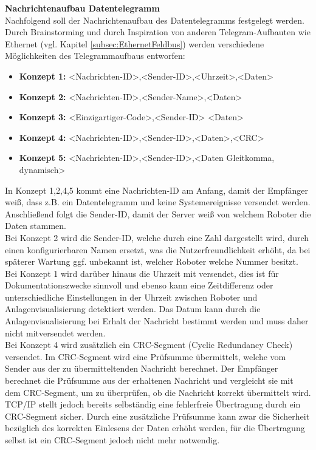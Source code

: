 \documentclass[ a4paper,
                oneside,
                toc=bibliography,
                toc=listof
                ]{scrbook}
\begin{document}
	\textbf{Nachrichtenaufbau Datentelegramm}\\
	Nachfolgend soll der Nachrichtenaufbau des Datentelegramms festgelegt werden. Durch Brainstorming und durch Inspiration von anderen Telegram-Aufbauten wie Ethernet (vgl. Kapitel \ref{subsec:EthernetFeldbus}) werden verschiedene Möglichkeiten des Telegrammaufbaus entworfen:\\
	\begin{itemize}
		\item \textbf{Konzept 1:} <Nachrichten-ID>,<Sender-ID>,<Uhrzeit>,<Daten>
		\item \textbf{Konzept 2:} <Nachrichten-ID>,<Sender-Name>,<Daten>
		\item \textbf{Konzept 3:} <Einzigartiger-Code>,<Sender-ID>
		<Daten>
		\item \textbf{Konzept 4:} <Nachrichten-ID>,<Sender-ID>,<Daten>,<CRC>
		\item \textbf{Konzept 5:} <Nachrichten-ID>,<Sender-ID>,<Daten Gleitkomma, dynamisch>
	\end{itemize}
	In Konzept 1,2,4,5 kommt eine Nachrichten-ID am Anfang, damit der Empfänger weiß, dass z.B. ein Datentelegramm und keine Systemereignisse versendet werden. Anschließend folgt die Sender-ID, damit der Server weiß von welchem Roboter die Daten stammen.\\
	Bei Konzept 2 wird die Sender-ID, welche durch eine Zahl dargestellt wird, durch einen konfigurierbaren Namen ersetzt, was die Nutzerfreundlichkeit erhöht, da bei späterer Wartung ggf. unbekannt ist, welcher Roboter welche Nummer besitzt. \\
	Bei Konzept 1 wird darüber hinaus die Uhrzeit mit versendet, dies ist für Dokumentationszwecke sinnvoll und ebenso kann eine Zeitdifferenz oder unterschiedliche Einstellungen in der Uhrzeit zwischen Roboter und Anlagenvisualisierung detektiert werden. Das Datum kann durch die Anlagenvisualisierung bei Erhalt der Nachricht bestimmt werden und muss daher nicht mitversendet werden. \\
	Bei Konzept 4 wird zusätzlich ein CRC-Segment (Cyclic Redundancy Check)  versendet. Im CRC-Segment wird eine Prüfsumme übermittelt, welche vom Sender aus der zu übermitteltenden Nachricht berechnet. Der Empfänger berechnet die Prüfsumme aus der erhaltenen Nachricht und vergleicht sie mit dem CRC-Segment, um zu überprüfen, ob die Nachricht korrekt übermittelt wird. TCP/IP stellt jedoch bereits selbständig eine fehlerfreie Übertragung durch ein CRC-Segment sicher. Durch eine zusätzliche Prüfsumme kann zwar die Sicherheit bezüglich des korrekten Einlesens der Daten erhöht werden, für die Übertragung selbst ist ein CRC-Segment jedoch nicht mehr notwendig. \\
\end{document}
